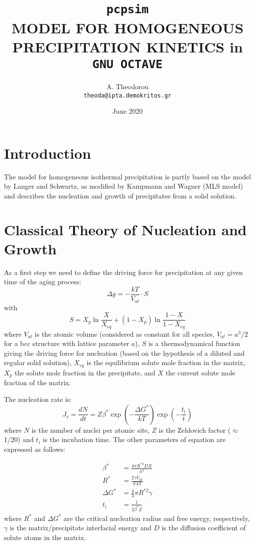 \documentclass[12pt,a4paper]{article}
\author{
  A. Theodorou\\
  \texttt{theoda@ipta.demokritos.gr}
}
\date{June 2020}
\title{\texttt{pcpsim} \\ 
MODEL FOR HOMOGENEOUS PRECIPITATION KINETICS in \texttt{GNU OCTAVE}
}
\begin{document}
\maketitle

\section{Introduction}
The model for homogeneous isothermal precipitation is partly based on the model by Langer and Schwartz, as modified by Kampmann and Wagner (MLS model) and describes the nucleation and growth of  precipitates from a solid solution.


\section{Classical Theory of Nucleation and Growth}

As a first step we need to define the driving force for precipitation at any given time of the aging process: 
\begin{equation}
\Delta g = - \frac{kT}{V_{at}} \cdot S 
\end{equation}
with
\begin{equation}
S =  X_p \ln\frac{X}{X_{eq}} + (1 - X_p) \ln\frac{1 - X}{1-X_{eq}} 
\end{equation}
where $V_{at}$ is the atomic volume (considered as constant for all species, $V_{at}=a^3/2$ for a bcc structure with lattice parameter $a$), $S$ is a thermodynamical function giving the driving force for nucleation (based
on the hypothesis of a diluted and regular solid solution), $X_{eq}$ is the equilibrium solute mole fraction in the matrix, $X_p$ the solute mole fraction in the precipitate, and $X$ the current solute mole fraction of the matrix.

The nucleation rate is:
\begin{equation}
\label{P_density}
J_s = \frac{d N}{d t} = Z \beta^* \exp(-\frac{\Delta G^*}{kT}) \exp(-\frac{t_i}{t})
\end{equation}
where $N$ is the number of nuclei per atomic site, $Z$ is the Zeldovich factor ($\approx$ 1/20) and $t_i$ is the incubation time. The other parameters of equation are expressed as follows:

\begin{subequations}
	\begin{align}
\beta^* &= \frac{4\pi R^{*2} D X}{a^4} \\
R^* &= \frac{2\gamma V_{at}}{S\,kT} \\
\Delta G^* &= \frac{4}{3}\pi R^{*2}\gamma \\
t_i &= \frac{1}{2\beta^* Z} 
	\end{align}	
\end{subequations}
where $R^*$ and $\Delta G^*$ are the critical nucleation radius and free energy, respectively, $\gamma$ is the matrix/precipitate interfacial energy and $D$ is the diffusion coefficient of solute atoms in the matrix.
\end{document}
